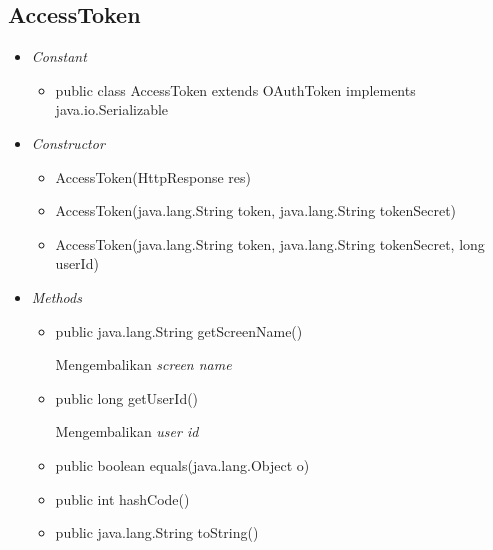 \subsection{AccessToken}
	\begin{itemize}
		\item \textit{Constant}
		
		\begin{itemize}
			\item public class AccessToken
			extends OAuthToken
			implements java.io.Serializable
						
		\end{itemize}
		\item \textit{Constructor}
		
		\begin{itemize}
			\item AccessToken(HttpResponse res) 
			\item AccessToken(java.lang.String token, java.lang.String tokenSecret) 
			\item AccessToken(java.lang.String token, java.lang.String tokenSecret, long userId) 
		\end{itemize}
		\item \textit{Methods}
		
		\begin{itemize}
			\item public java.lang.String getScreenName()
			
			Mengembalikan \textit{screen name}
			\item public long getUserId()
			
			Mengembalikan \textit{user id}
			\item public boolean equals(java.lang.Object o)
			\item public int hashCode()
			\item public java.lang.String toString()
		\end{itemize}
	\end{itemize}
	
